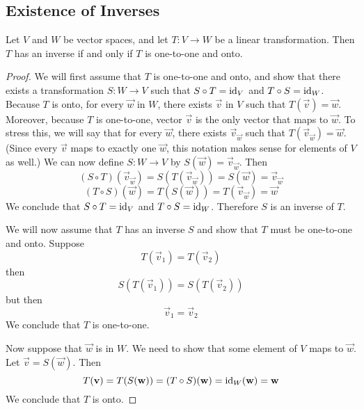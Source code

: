 \documentclass{ximera}
\begin{document}
\subsection*{Existence of Inverses}
\begin{theorem}\label{th:isomeansinvert} Let $V$ and $W$ be vector spaces, and let $T:V\rightarrow W$ be a linear transformation.  Then $T$ has an inverse if and only if $T$ is one-to-one and onto. 
\end{theorem}
\begin{proof}
We will first assume that $T$ is one-to-one and onto, and show that there exists a transformation $S:W\rightarrow V$ such that $S\circ T=\text{id}_V$ and $T\circ S=\text{id}_W$.  Because $T$ is onto, for every $\vec{w}$ in $W$, there exists $\vec{v}$ in $V$ such that $T(\vec{v})=\vec{w}$.  Moreover, because $T$ is one-to-one, vector $\vec{v}$ is the only vector that maps to $\vec{w}$.  To stress this, we will say that for every $\vec{w}$, there exists $\vec{v}_{\vec{w}}$ such that $T(\vec{v}_{\vec{w}})=\vec{w}$. (Since every $\vec{v}$ maps to exactly one $\vec{w}$, this notation makes sense for elements of $V$ as well.)  We can now define $S:W\rightarrow V$ by $S(\vec{w})=\vec{v}_{\vec{w}}$.
Then
$$(S\circ T)(\vec{v}_{\vec{w}})=S(T(\vec{v}_{\vec{w}}))=S(\vec{w})=\vec{v}_{\vec{w}}$$
$$(T\circ S)(\vec{w})=T(S(\vec{w}))=T(\vec{v}_{\vec{w}})=\vec{w}$$
We conclude that $S\circ T=\text{id}_V$ and $T\circ S=\text{id}_W$.  Therefore $S$ is an inverse of $T$.

We will now assume that $T$ has an inverse $S$ and show that $T$ must be one-to-one and onto.  
Suppose $$T(\vec{v}_1)=T(\vec{v}_2)$$ then $$S(T(\vec{v}_1))=S(T(\vec{v}_2))$$
but then
$$\vec{v}_1=\vec{v}_2$$
We conclude that $T$ is one-to-one.

Now suppose that $\vec{w}$ is in $W$.  We need to show that some element of $V$ maps to $\vec{w}$.  Let $\vec{v}=S(\vec{w})$.  Then
$$T(\mathbf{v})=T(S(\mathbf{w}))=(T\circ S)(\mathbf{w})=\text{id}_W(\mathbf{w})=\mathbf{w}$$
We conclude that $T$ is onto.
\end{proof}
\end{document}
